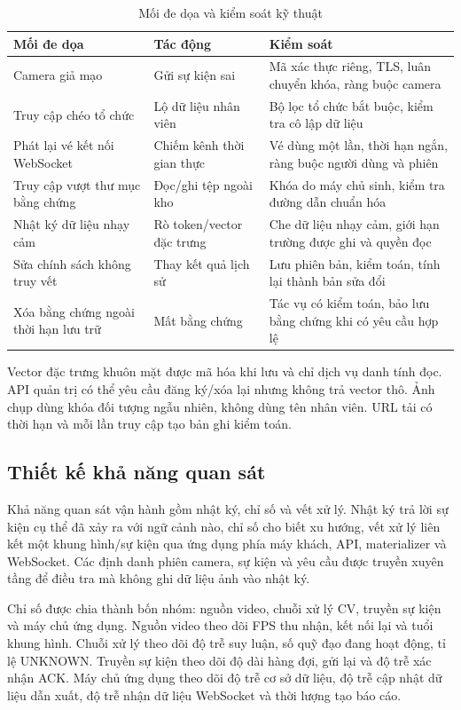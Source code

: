 \begin{table}[H]
\centering
\caption{Mối đe dọa và kiểm soát kỹ thuật}
\label{tab:threat-controls}
\begin{tabularx}{\textwidth}{p{3.6cm}X X}
\toprule
\textbf{Mối đe dọa} & \textbf{Tác động} & \textbf{Kiểm soát}\\
\midrule
Camera giả mạo & Gửi sự kiện sai & Mã xác thực riêng, TLS, luân chuyển khóa, ràng buộc camera\\
Truy cập chéo tổ chức & Lộ dữ liệu nhân viên & Bộ lọc tổ chức bắt buộc, kiểm tra cô lập dữ liệu\\
Phát lại vé kết nối WebSocket & Chiếm kênh thời gian thực & Vé dùng một lần, thời hạn ngắn, ràng buộc người dùng và phiên\\
Truy cập vượt thư mục bằng chứng & Đọc/ghi tệp ngoài kho & Khóa do máy chủ sinh, kiểm tra đường dẫn chuẩn hóa\\
Nhật ký dữ liệu nhạy cảm & Rò token/vector đặc trưng & Che dữ liệu nhạy cảm, giới hạn trường được ghi và quyền đọc\\
Sửa chính sách không truy vết & Thay kết quả lịch sử & Lưu phiên bản, kiểm toán, tính lại thành bản sửa đổi\\
Xóa bằng chứng ngoài thời hạn lưu trữ & Mất bằng chứng & Tác vụ có kiểm toán, bảo lưu bằng chứng khi có yêu cầu hợp lệ\\
\bottomrule
\end{tabularx}
\end{table}

Vector đặc trưng khuôn mặt được mã hóa khi lưu và chỉ dịch vụ danh tính đọc. API quản trị có thể yêu cầu đăng ký/xóa lại nhưng không trả vector thô. Ảnh chụp dùng khóa đối tượng ngẫu nhiên, không dùng tên nhân viên. URL tải có thời hạn và mỗi lần truy cập tạo bản ghi kiểm toán.

\subsection{Thiết kế khả năng quan sát}
Khả năng quan sát vận hành gồm nhật ký, chỉ số và vết xử lý. Nhật ký trả lời sự kiện cụ thể đã xảy ra với ngữ cảnh nào, chỉ số cho biết xu hướng, vết xử lý liên kết một khung hình/sự kiện qua ứng dụng phía máy khách, API, materializer và WebSocket. Các định danh phiên camera, sự kiện và yêu cầu được truyền xuyên tầng để điều tra mà không ghi dữ liệu ảnh vào nhật ký.

Chỉ số được chia thành bốn nhóm: nguồn video, chuỗi xử lý CV, truyền sự kiện và máy chủ ứng dụng. Nguồn video theo dõi FPS thu nhận, kết nối lại và tuổi khung hình. Chuỗi xử lý theo dõi độ trễ suy luận, số quỹ đạo đang hoạt động, tỉ lệ UNKNOWN. Truyền sự kiện theo dõi độ dài hàng đợi, gửi lại và độ trễ xác nhận ACK. Máy chủ ứng dụng theo dõi độ trễ cơ sở dữ liệu, độ trễ cập nhật dữ liệu dẫn xuất, độ trễ nhận dữ liệu WebSocket và thời lượng tạo báo cáo.

